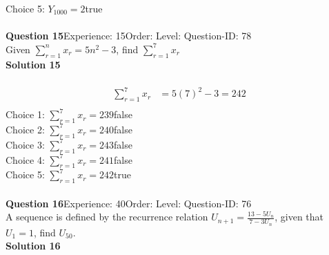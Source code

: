 \documentclass{article}
\begin{document}
Choice 5: \hspace{20pt}$Y_{1000}=2$\hspace{20pt}true\\
\\[4pt]
\noindent\textbf{Question 15}\hspace{20pt}Experience: 15\hspace{20pt}Order: \hspace{20pt}Level: \hspace{20pt}Question-ID: 78\\[2pt]
Given $\displaystyle\sum_{r=1}^{n} x_r = 5n^2-3$, find $\displaystyle\sum_{r=1}^{7} x_r$\\[4pt]
\noindent\textbf{Solution 15}\\[2pt]
\\[-35pt]\begin{align*}
\displaystyle\sum_{r=1}^{7} x_r&=5(7)^2-3=242\\[2pt]
\end{align*}
Choice 1: \hspace{20pt}$\displaystyle\sum_{r=1}^{7} x_r=239$\hspace{20pt}false\\
Choice 2: \hspace{20pt}$\displaystyle\sum_{r=1}^{7} x_r=240$\hspace{20pt}false\\
Choice 3: \hspace{20pt}$\displaystyle\sum_{r=1}^{7} x_r=243$\hspace{20pt}false\\
Choice 4: \hspace{20pt}$\displaystyle\sum_{r=1}^{7} x_r=241$\hspace{20pt}false\\
Choice 5: \hspace{20pt}$\displaystyle\sum_{r=1}^{7} x_r=242$\hspace{20pt}true\\
\\[4pt]
\noindent\textbf{Question 16}\hspace{20pt}Experience: 40\hspace{20pt}Order: \hspace{20pt}Level: \hspace{20pt}Question-ID: 76\\[2pt]
A sequence is defined by the recurrence relation $U_{n+1}=\displaystyle\frac{13-5U_n}{7-3U_n}$, given that  $U_1 =1$, find $U_{50}$.\\[4pt]
\noindent\textbf{Solution 16}\\[2pt]
\end{document}
